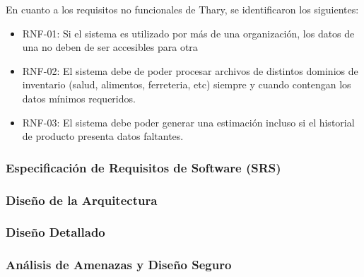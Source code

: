 En cuanto a los requisitos no funcionales de Thary, se identificaron los siguientes:

\begin{itemize}
    \item RNF-01: Si el sistema es utilizado por más de una organización, los datos de una no deben de ser accesibles para otra
    \item RNF-02: El sistema debe de poder procesar archivos de distintos dominios de inventario (salud, alimentos, ferreteria, etc) siempre y cuando contengan los datos mínimos requeridos.
    \item RNF-03: El sistema debe poder generar una estimación incluso si el historial de producto presenta datos faltantes.
\end{itemize}

\subsubsection{Especificación de Requisitos de Software (SRS)}


\subsubsection{Diseño de la Arquitectura}


\subsubsection{Diseño Detallado}


\subsubsection{Análisis de Amenazas y Diseño Seguro}

